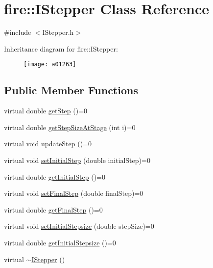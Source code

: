 \hypertarget{a01263}{}\section{fire\+:\+:I\+Stepper Class Reference}
\label{a01263}


{\ttfamily \#include $<$I\+Stepper.\+h$>$}

Inheritance diagram for fire\+:\+:I\+Stepper\+:\begin{figure}[H]
\begin{center}
\leavevmode
\texttt{[image: a01263]}
\end{center}
\end{figure}
\subsection*{Public Member Functions}
\begin{DoxyCompactItemize}
\item 
virtual double \hyperlink{a01263_a7f709d1462a2a3b8bd8214cc681ca26e}{get\+Step} ()=0
\item 
virtual double \hyperlink{a01263_a43027c0c268afcd59db8815c2e2c41ea}{get\+Step\+Size\+At\+Stage} (int i)=0
\item 
virtual void \hyperlink{a01263_a44dfccb90ee5ef6e080b54113c215458}{update\+Step} ()=0
\item 
virtual void \hyperlink{a01263_a3a5099cd0f3c874e56c33cb8f13b8f3b}{set\+Initial\+Step} (double initial\+Step)=0
\item 
virtual double \hyperlink{a01263_a49df3a2ac05cebaf2baf387b66d19272}{get\+Initial\+Step} ()=0
\item 
virtual void \hyperlink{a01263_add76974a7b6fbbc93916270a376c461e}{set\+Final\+Step} (double final\+Step)=0
\item 
virtual double \hyperlink{a01263_ab234d9f032e02668aededf1c22e8c0a9}{get\+Final\+Step} ()=0
\item 
virtual void \hyperlink{a01263_a69c262f248511efcd271be1724a41ad9}{set\+Initial\+Stepsize} (double step\+Size)=0
\item 
virtual double \hyperlink{a01263_afb777e62386b25e5a38d59af54972690}{get\+Initial\+Stepsize} ()=0
\item 
virtual \hyperlink{a01263_ac8ec460d35512e2e039396d5192eb57e}{$\sim$\+I\+Stepper} ()
\end{DoxyCompactItemize}



